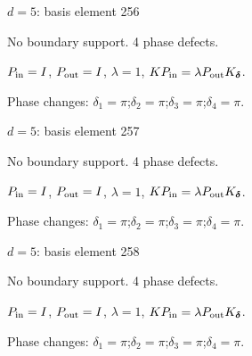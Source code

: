 \newpage
{}
{\Large $d=5$: basis element 256}\par
No boundary support. 4 phase defects.
\begin{center}
\end{center}
\vspace{-1mm}
$P_{\rm in}=I$, \quad $P_{\rm out}=I$, \quad $\lambda=1$, \qquad $K P_{\rm in}=\lambda P_{\rm out}K_{\boldsymbol\delta}$.
\par\smallskip\begin{minipage}{.98\linewidth}\small Phase changes: $\delta_{1}=\pi$;\quad $\delta_{2}=\pi$;\quad $\delta_{3}=\pi$;\quad $\delta_{4}=\pi$.\end{minipage}
\vfill
{\footnotesize\texttt{}}
\newpage
{}
{\Large $d=5$: basis element 257}\par
No boundary support. 4 phase defects.
\begin{center}
\end{center}
\vspace{-1mm}
$P_{\rm in}=I$, \quad $P_{\rm out}=I$, \quad $\lambda=1$, \qquad $K P_{\rm in}=\lambda P_{\rm out}K_{\boldsymbol\delta}$.
\par\smallskip\begin{minipage}{.98\linewidth}\small Phase changes: $\delta_{1}=\pi$;\quad $\delta_{2}=\pi$;\quad $\delta_{3}=\pi$;\quad $\delta_{4}=\pi$.\end{minipage}
\vfill
{\footnotesize\texttt{}}
\newpage
{}
{\Large $d=5$: basis element 258}\par
No boundary support. 4 phase defects.
\begin{center}
\end{center}
\vspace{-1mm}
$P_{\rm in}=I$, \quad $P_{\rm out}=I$, \quad $\lambda=1$, \qquad $K P_{\rm in}=\lambda P_{\rm out}K_{\boldsymbol\delta}$.
\par\smallskip\begin{minipage}{.98\linewidth}\small Phase changes: $\delta_{1}=\pi$;\quad $\delta_{2}=\pi$;\quad $\delta_{3}=\pi$;\quad $\delta_{4}=\pi$.\end{minipage}
\vfill
{\footnotesize\texttt{}}
\newpage
{}
